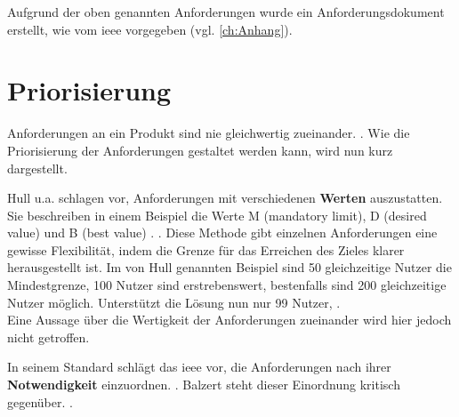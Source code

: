 Aufgrund der oben genannten Anforderungen wurde ein Anforderungsdokument erstellt, wie vom \ac{ieee} vorgegeben (vgl. \autoref{ch:Anhang}). 

\section{Priorisierung}

Anforderungen an ein Produkt sind nie gleichwertig zueinander. 
 \citep[][83]{Hull2010}. Wie die Priorisierung der Anforderungen gestaltet werden kann, wird nun kurz dargestellt.

Hull u.a. schlagen vor, Anforderungen mit verschiedenen \textbf{Werten} auszustatten. Sie beschreiben in einem Beispiel die Werte M (mandatory limit), D (desired value) und B (best value) \citep[vgl.][83]{Hull2010}.  \citep[][83]{Hull2010}.
Diese Methode gibt einzelnen Anforderungen eine gewisse Flexibilität, indem die Grenze für das Erreichen des Zieles klarer herausgestellt ist. Im von Hull \ua genannten Beispiel sind 50 gleichzeitige Nutzer die Mindestgrenze, 100 Nutzer sind erstrebenswert, bestenfalls sind 200 gleichzeitige Nutzer möglich. Unterstützt die Lösung nun nur 99 Nutzer,  \citep[][83]{Hull2010}.\\
Eine Aussage über die Wertigkeit der Anforderungen zueinander wird hier jedoch nicht getroffen. 

In seinem Standard schlägt das \ac{ieee} vor, die Anforderungen nach ihrer \textbf{Notwendigkeit} einzuordnen.  \citep[][7]{ieee1998}. Balzert steht dieser Einordnung kritisch gegenüber.  \citep[][543]{Balzert2010}.

